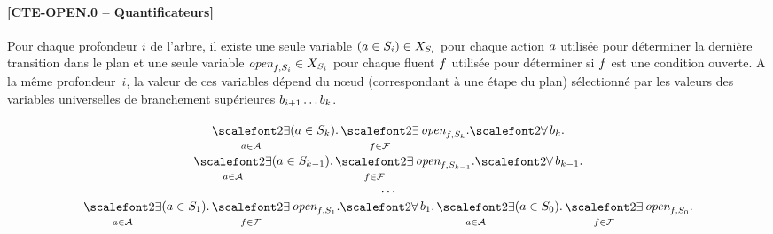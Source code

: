 \paragraph*{[CTE-OPEN.0 -- Quantificateurs]}

Pour chaque profondeur $i$ de l'arbre, %
il existe une seule variable $(a \in S_{i})\in X_{S_{i}}$ pour chaque action $a$ utilisée pour déterminer la dernière transition dans le plan et une seule variable $\textit{open}_{f,S_{i}}\in X_{S_{i}}$ pour chaque fluent $f$ utilisée pour déterminer si $f$ est une condition ouverte. A la même profondeur~$i$, la valeur de ces variables dépend du n\oe ud (correspondant à une étape du plan) sélectionné par les valeurs des variables universelles de branchement supérieures $b_{i+1}\ldots b_{k}$.


\begin{small}
\[
\begin{matrix}
\displaystyle \bigexists_{\a \in \A} \instepcte{\a}{\depth}. \bigexists_{\f\in \F} \openstepcte{\f}{\depth}.%
\displaystyle {\bigforall b_{\depth}.}\\
\displaystyle \bigexists_{\a \in \A} \instepcte{\a}{\depth-1}. \bigexists_{\f\in \F} \openstepcte{\f}{\depth-1}.%
\displaystyle {\bigforall b_{\depth-1}.}\\
\displaystyle \dots\\ 
\displaystyle \bigexists_{\a \in \A} \instepcte{\a}{1}. \bigexists_{\f\in \F} \openstepcte{\f}{1}.%
\displaystyle {\bigforall b_{1}.}%
\displaystyle \bigexists_{\a \in \A} \instepcte{\a}{0}. \bigexists_{\f\in \F} \openstepcte{\f}{0}.
\end{matrix}
\]
\end{small}\\

